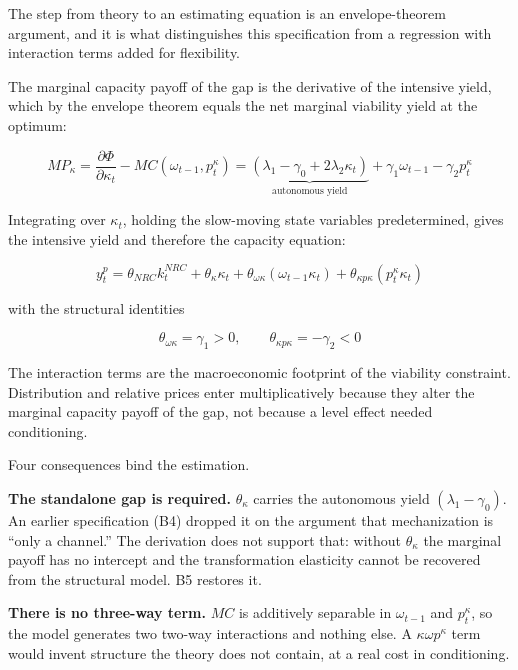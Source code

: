 \documentclass[11pt,a4paper]{article}
\begin{document}
The step from theory to an estimating equation is an envelope-theorem argument, and it is what distinguishes this specification from a regression with interaction terms added for flexibility.

The marginal capacity payoff of the gap is the derivative of the intensive yield, which by the envelope theorem equals the net marginal viability yield at the optimum:

\begin{equation}
MP_{\kappa} = \frac{\partial \Phi}{\partial \kappa_t} - MC(\omega_{t-1}, p^{\kappa}_t) = \underbrace{(\lambda_1 - \gamma_0 + 2\lambda_2 \kappa_t)}_{\text{autonomous yield}} + \gamma_1 \omega_{t-1} - \gamma_2 p^{\kappa}_t
\end{equation}

Integrating over $\kappa_t$, holding the slow-moving state variables predetermined, gives the intensive yield and therefore the capacity equation:

\begin{equation}
y^p_t = \theta_{NRC} k^{NRC}_t + \theta_{\kappa} \kappa_t + \theta_{\omega\kappa}(\omega_{t-1}\kappa_t) + \theta_{\kappa p\kappa}(p^{\kappa}_t \kappa_t)
\label{eq:b5}
\end{equation}

with the structural identities

\begin{equation}
\theta_{\omega\kappa} = \gamma_1 > 0, \qquad \theta_{\kappa p\kappa} = -\gamma_2 < 0
\end{equation}

The interaction terms are the macroeconomic footprint of the viability constraint. Distribution and relative prices enter multiplicatively because they alter the marginal capacity payoff of the gap, not because a level effect needed conditioning.

Four consequences bind the estimation.

\textbf{The standalone gap is required.} $\theta_{\kappa}$ carries the autonomous yield $(\lambda_1 - \gamma_0)$. An earlier specification (B4) dropped it on the argument that mechanization is ``only a channel.'' The derivation does not support that: without $\theta_{\kappa}$ the marginal payoff has no intercept and the transformation elasticity cannot be recovered from the structural model. B5 restores it.

\textbf{There is no three-way term.} $MC$ is additively separable in $\omega_{t-1}$ and $p^{\kappa}_t$, so the model generates two two-way interactions and nothing else. A $\kappa\omega p^{\kappa}$ term would invent structure the theory does not contain, at a real cost in conditioning.
\end{document}

